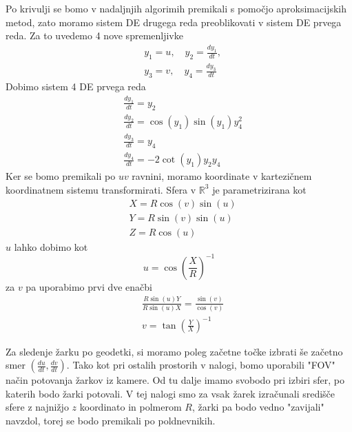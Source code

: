 \documentclass[titlepage]{article}
\begin{document}
Po krivulji se bomo v nadaljnjih algorimih premikali s pomočjo aproksimacijskih metod, zato moramo sistem DE drugega reda preoblikovati v 
sistem DE prvega reda. Za to uvedemo 4 nove spremenljivke
\begin{equation}
\begin{split}
    &y_{1}=u, \quad y_{2}=\frac{dy_{1}}{dt}, \\
    &y_{3}=v, \quad y_{4}=\frac{dy_{3}}{dt}
\end{split}
\end{equation}
Dobimo sistem 4 DE prvega reda
\begin{equation}
\begin{split}
    &\frac{dy_{1}}{dt}=y_{2} \\
    &\frac{dy_{2}}{dt}=\cos(y_{1})\sin(y_{1})y^{2}_{4} \\
    &\frac{dy_{3}}{dt}=y_{4} \\
    &\frac{dy_{4}}{dt}=-2\cot(y_{1})y_{2}y_{4}
\end{split}
\end{equation}
Ker se bomo premikali po $uv$ ravnini, moramo koordinate v kartezičnem koordinatnem sistemu transformirati. Sfera v $\mathbb{R}^3$ je 
parametrizirana kot
\begin{equation}
    \begin{split}
        &X=R\cos(v)\sin(u) \\
        &Y=R\sin(v)\sin(u) \\
        &Z=R\cos(u)
    \end{split}
\end{equation}
$u$ lahko dobimo kot
\begin{equation}
        u=\cos \left( \frac{X}{R} \right)^{-1}
\end{equation}
za $v$ pa uporabimo prvi dve enačbi
\begin{equation}
    \begin{split}
        &\frac{R\sin(u)Y}{R\sin(u)X}=\frac{\sin(v)}{\cos(v)} \\
        &v=\tan \left(\frac{Y}{X} \right)^{-1}
    \end{split}
\end{equation}

Za sledenje žarku po geodetki, si moramo poleg začetne točke izbrati še začetno smer 
$\left( \frac{du}{dt}, \frac{dv}{dt} \right)$. Tako kot pri ostalih prostorih v nalogi, bomo uporabili "FOV" način 
potovanja žarkov iz kamere. Od tu dalje imamo svobodo pri izbiri sfer, po katerih bodo žarki potovali. V tej nalogi smo za 
vsak žarek izračunali središče sfere z najnižjo $z$ koordinato in polmerom $R$, žarki pa bodo vedno "zavijali" navzdol, torej se bodo premikali po poldnevnikih.
\end{document}

